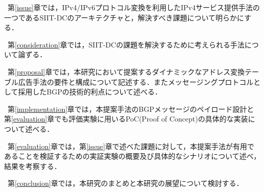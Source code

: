 ~第\ref{issue}章では，IPv4/IPv6プロトコル変換を利用したIPv4サービス提供手法の一つであるSIIT-DCのアーキテクチャと，解決すべき課題について明らかにする．

~第\ref{consideration}章では，SIIT-DCの課題を解決するために考えられる手法について論ずる．

~第\ref{proposal}章では，本研究において提案するダイナミックなアドレス変換テーブル広告手法の要件と構成について記述する．またメッセージングプロトコルとして採用したBGPの技術的利点について述べる．

~第\ref{implementation}章では，本提案手法のBGPメッセージのペイロード設計と第\ref{evaluation}章でも評価実験に用いるPoC(Proof of Concept)の具体的な実装について述べる．

~第\ref{evaluation}章では，第\ref{issue}章で述べた課題に対して，本提案手法が有用であることを検証するための実証実験の概要及び具体的なシナリオについて述べ，結果を考察する．

~第\ref{conclusion}章では，本研究のまとめと本研究の展望について検討する．

